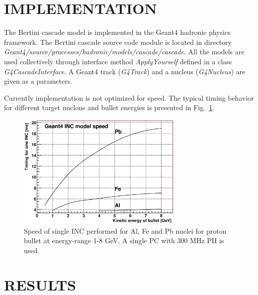 \documentclass[twocolumn,twoside,slac,floatfix]{revtex4}
\begin{document}




\section{IMPLEMENTATION}


The Bertini cascade model is implemented in the Geant4 hadronic physics framework. The Bertini cascade source code module is located in directory {\it Geant4/\-source/\-processes/\-hadronic/\-models/\-cascade/\-cascade}.
All the models are used collectively through interface method {\it Apply\-Yourself} defined in a class {\it G4Cascade\-Interface}.
A Geant4 track  ({\it G4Track}) and a nucleus ({\it G4Nucleus}) are given as a parameters.


Currently implementation is not optimized for speed.
The typical timing behavior for different target nuclons and bullet energies is presented in Fig.~\ref{timingModel}.

\begin{figure}
  \includegraphics[width=80mm,keepaspectratio]{tIsotopeVsEnergy.eps}
  \caption{Speed of single INC performed for Al, Fe and Pb nuclei for proton bullet at energy-range 1-8 GeV.
A single PC with 300 MHz PII is used.}
  \label{timingModel}
\end{figure}

\section{RESULTS}
\label{results}
\end{document}
